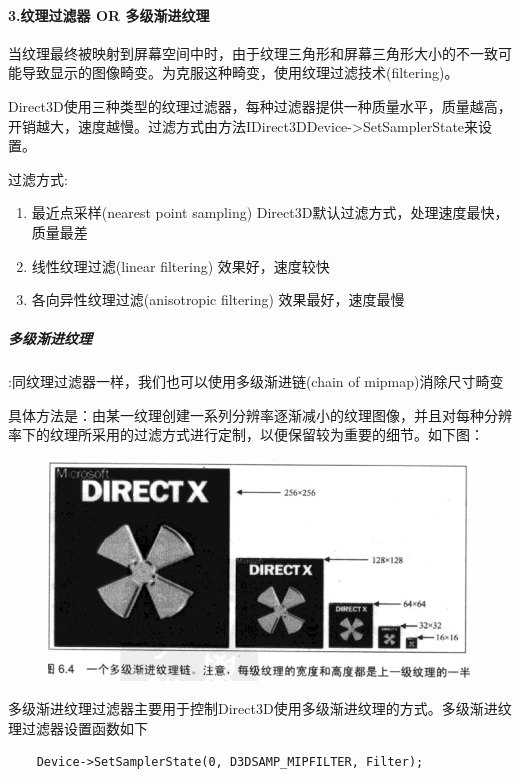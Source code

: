 \documentclass[UTF8,a4paper,8pt]{ctexart}
\begin{document}
	\paragraph{3.纹理过滤器 OR 多级渐进纹理}
			当纹理最终被映射到屏幕空间中时，由于纹理三角形和屏幕三角形大小的不一致可能导致显示的图像畸变。为克服这种畸变，使用纹理过滤技术(filtering)。
				
			 Direct3D使用三种类型的纹理过滤器，每种过滤器提供一种质量水平，质量越高，开销越大，速度越慢。过滤方式由方法IDirect3DDevice->SetSamplerState来设置。
				  
			 过滤方式:
				  \begin{enumerate}[fullwidth, itemindent = 3em]
					  \item 最近点采样(nearest point sampling)  Direct3D默认过滤方式，处理速度最快，质量最差
					  \item 线性纹理过滤(linear filtering)   效果好，速度较快
					  \item 各向异性纹理过滤(anisotropic filtering)   效果最好，速度最慢
				  \end{enumerate}
				  
			\subparagraph{多级渐进纹理}:同纹理过滤器一样，我们也可以使用多级渐进链(chain of mipmap)消除尺寸畸变
				  
				  具体方法是：由某一纹理创建一系列分辨率逐渐减小的纹理图像，并且对每种分辨率下的纹理所采用的过滤方式进行定制，以便保留较为重要的细节。如下图：
				    \begin{figure}[h]
					  	\centering
					  	\includegraphics[width=12cm]{Texture.png}
					  \end{figure}
					  
				  多级渐进纹理过滤器主要用于控制Direct3D使用多级渐进纹理的方式。多级渐进纹理过滤器设置函数如下
				  \begin{lstlisting}
	Device->SetSamplerState(0, D3DSAMP_MIPFILTER, Filter); 
				  \end{lstlisting}
				  
\end{document}
